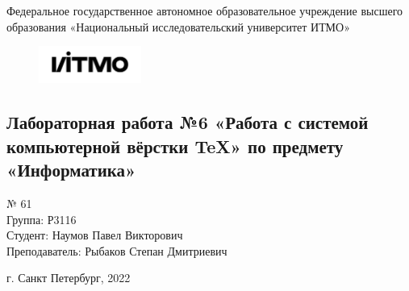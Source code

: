 \begin{center}
\large
Федеральное государственное автономное образовательное учреждение высшего образования
«Национальный исследовательский университет ИТМО»
\end{center}
\begin{figure}[h]
\centering
\includegraphics[width=0.3\textwidth]{logo_itmo}
\end{figure}
\vspace{1cm}
\begin{center}
\section*{Лабораторная работа №6 «Работа с системой компьютерной вёрстки \TeX» по предмету \\«Информатика»}
\end{center}
\vspace{9cm}
\begin{flushright}
 № 61\\Группа: Р3116\\Студент: Наумов Павел Викторович\\Преподаватель: Рыбаков Степан Дмитриевич\\
\end{flushright}
\vspace{3cm}
\begin{center}
\vspace{2cm}
г. Санкт Петербург, 2022
\end{center}
\thispagestyle{empty}